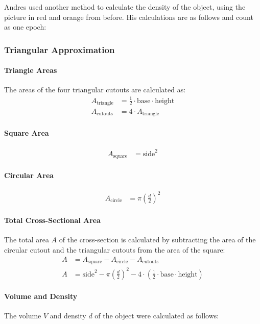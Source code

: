 \documentclass{article}
\begin{document}
Andres used another method to calculate the density of the object, using the picture in red and orange from before. His calculations are as follows and count as one epoch:

\subsubsection{Triangular Approximation}
\paragraph{Triangle Areas}
The areas of the four triangular cutouts are calculated as:
\begin{align*}
A_{\text{triangle}} &= \frac{1}{2} \cdot \text{base} \cdot \text{height} \\
A_{\text{cutouts}} &= 4 \cdot A_{\text{triangle}}
\end{align*}

\paragraph{Square Area}
\begin{align*}
A_{\text{square}} &= \text{side}^2
\end{align*}

\paragraph{Circular Area}
\begin{align*}
A_{\text{circle}} &= \pi \left(\frac{d}{2}\right)^2
\end{align*}

\paragraph{Total Cross-Sectional Area}
The total area \( A \) of the cross-section is calculated by subtracting the area of the circular cutout and the triangular cutouts from the area of the square:
\begin{align*}
A &= A_{\text{square}} - A_{\text{circle}} - A_{\text{cutouts}} \\
A &= \text{side}^2 - \pi \left(\frac{d}{2}\right)^2 - 4 \cdot \left(\frac{1}{2} \cdot \text{base} \cdot \text{height}\right)
\end{align*}

\paragraph{Volume and Density}
The volume \( V \) and density \( d \) of the object were calculated as follows:
\end{document}
